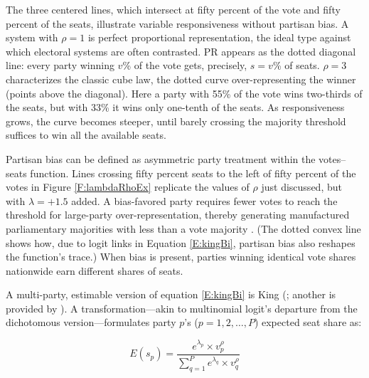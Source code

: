 \documentclass[letter,12pt]{article}
\begin{document}
The three centered lines, which intersect at fifty percent of the vote and fifty percent of the seats, illustrate variable responsiveness without partisan bias. A system with $\rho=1$ is perfect proportional representation, the ideal type against which electoral systems are often contrasted. PR appears as the dotted diagonal line: every party winning $v$\% of the vote gets, precisely, $s=v$\% of seats. $\rho=3$ characterizes the classic cube law, the dotted curve over-representing the winner (points above the diagonal). Here a party with 55\% of the vote wins two-thirds of the seats, but with 33\% it wins only one-tenth of the seats. As responsiveness grows, the curve becomes steeper, until barely crossing the majority threshold suffices to win all the available seats. 

Partisan bias can be defined as asymmetric party treatment within the votes--seats function. Lines crossing fifty percent seats to the left of fifty percent of the votes in Figure \ref{F:lambdaRhoEx} replicate the values of $\rho$ just discussed, but with $\lambda = +1.5$ added. A bias-favored party requires fewer votes to reach the threshold for large-party over-representation, thereby generating manufactured parliamentary majorities with less than a vote majority \citep{lijphartElSysPtySys.1994}. (The dotted convex line shows how, due to logit links in Equation \ref{E:kingBi}, partisan bias also reshapes the function's trace.) When bias is present, parties winning identical vote shares nationwide earn different shares of seats. 


A multi-party, estimable version of equation \ref{E:kingBi} is King (\citeyear{king.1990elRespBiasMultiparty}; another is provided by \citeauthor{calvo.micozzi.govReform.2005} \citeyear{calvo.micozzi.govReform.2005}). A transformation---akin to multinomial logit's departure from the dichotomous version---formulates party $p$'s ($p=1,2,\ldots,P$) expected seat share as:

\begin{equation}\label{E:kingMulti}
 E(s_p) = \frac{e^{\lambda_p} \times v_p^\rho}{\sum_{q=1}^{P} e^{\lambda_q} \times v_q^\rho}
\end{equation}
\end{document}
